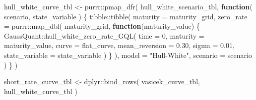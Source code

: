 \documentclass[
  letterpaper,
  DIV=11,
  numbers=noendperiod]{scrreprt}
\newenvironment{Shaded}{\begin{snugshade}}{\end{snugshade}}
\newcommand{\AttributeTok}[1]{\textcolor[rgb]{0.40,0.45,0.13}{#1}}
\newcommand{\ControlFlowTok}[1]{\textcolor[rgb]{0.00,0.23,0.31}{\textbf{#1}}}
\newcommand{\DecValTok}[1]{\textcolor[rgb]{0.68,0.00,0.00}{#1}}
\newcommand{\FloatTok}[1]{\textcolor[rgb]{0.68,0.00,0.00}{#1}}
\newcommand{\FunctionTok}[1]{\textcolor[rgb]{0.28,0.35,0.67}{#1}}
\newcommand{\NormalTok}[1]{\textcolor[rgb]{0.00,0.23,0.31}{#1}}
\newcommand{\OtherTok}[1]{\textcolor[rgb]{0.00,0.23,0.31}{#1}}
\newcommand{\SpecialCharTok}[1]{\textcolor[rgb]{0.37,0.37,0.37}{#1}}
\newcommand{\StringTok}[1]{\textcolor[rgb]{0.13,0.47,0.30}{#1}}
\begin{document}
\begin{Shaded}
\begin{Highlighting}[]
\NormalTok{hull\_white\_curve\_tbl }\OtherTok{\textless{}{-}}\NormalTok{ purrr}\SpecialCharTok{::}\FunctionTok{pmap\_dfr}\NormalTok{(}
\NormalTok{  hull\_white\_scenario\_tbl,}
  \ControlFlowTok{function}\NormalTok{(}
\NormalTok{    scenario,}
\NormalTok{    state\_variable}
\NormalTok{  ) \{}
\NormalTok{    tibble}\SpecialCharTok{::}\FunctionTok{tibble}\NormalTok{(}
      \AttributeTok{maturity =}\NormalTok{ maturity\_grid,}
      \AttributeTok{zero\_rate =}\NormalTok{ purrr}\SpecialCharTok{::}\FunctionTok{map\_dbl}\NormalTok{(}
\NormalTok{        maturity\_grid,}
        \ControlFlowTok{function}\NormalTok{(maturity\_value) \{}
\NormalTok{          GaussQuant}\SpecialCharTok{::}\FunctionTok{hull\_white\_zero\_rate\_GQL}\NormalTok{(}
            \AttributeTok{time =} \DecValTok{0}\NormalTok{,}
            \AttributeTok{maturity =}\NormalTok{ maturity\_value,}
            \AttributeTok{curve =}\NormalTok{ flat\_curve,}
            \AttributeTok{mean\_reversion =} \FloatTok{0.30}\NormalTok{,}
            \AttributeTok{sigma =} \FloatTok{0.01}\NormalTok{,}
            \AttributeTok{state\_variable =}\NormalTok{ state\_variable}
\NormalTok{          )}
\NormalTok{        \}}
\NormalTok{      ),}
      \AttributeTok{model =} \StringTok{"Hull{-}White"}\NormalTok{,}
      \AttributeTok{scenario =}\NormalTok{ scenario}
\NormalTok{    )}
\NormalTok{  \}}
\NormalTok{)}

\NormalTok{short\_rate\_curve\_tbl }\OtherTok{\textless{}{-}}\NormalTok{ dplyr}\SpecialCharTok{::}\FunctionTok{bind\_rows}\NormalTok{(}
\NormalTok{  vasicek\_curve\_tbl,}
\NormalTok{  hull\_white\_curve\_tbl}
\NormalTok{)}


\end{Highlighting}
\end{Shaded}
\end{document}
